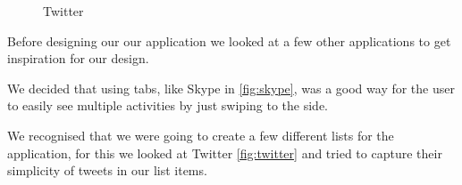 \begin{figure}[H]
\begin{minipage}[b]{0.5\columnwidth}
\caption{Twitter\label{fig:twitter}}
\end{minipage}
\end{figure}

Before designing our our application we looked at a few other applications to get inspiration for our design.

We decided that using tabs, like Skype in  \autoref{fig:skype}, was a good way for the user to easily see multiple activities by just swiping to the side.

We recognised that we were going to create a few different lists for the application, for this we looked at Twitter \autoref{fig:twitter} and tried to capture their simplicity of tweets in our list items.
